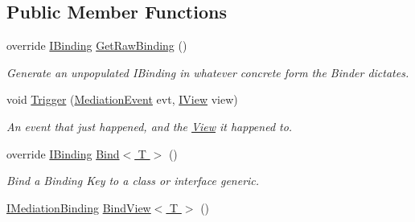 \subsection*{Public Member Functions}
\begin{DoxyCompactItemize}
\item 
\hypertarget{classstrange_1_1extensions_1_1mediation_1_1impl_1_1_mediation_binder_a8979dac1fe07f85a453ecb0b43cd9c48}{override \hyperlink{interfacestrange_1_1framework_1_1api_1_1_i_binding}{I\-Binding} \hyperlink{classstrange_1_1extensions_1_1mediation_1_1impl_1_1_mediation_binder_a8979dac1fe07f85a453ecb0b43cd9c48}{Get\-Raw\-Binding} ()}\label{classstrange_1_1extensions_1_1mediation_1_1impl_1_1_mediation_binder_a8979dac1fe07f85a453ecb0b43cd9c48}

\begin{DoxyCompactList}\small\item\em Generate an unpopulated I\-Binding in whatever concrete form the Binder dictates. \end{DoxyCompactList}\item 
void \hyperlink{classstrange_1_1extensions_1_1mediation_1_1impl_1_1_mediation_binder_a239e22ae10b9abac39d32533771457f8}{Trigger} (\hyperlink{namespacestrange_1_1extensions_1_1mediation_1_1api_ae5a81bb1edf9fca1d2aca9f4fada72a8}{Mediation\-Event} evt, \hyperlink{interfacestrange_1_1extensions_1_1mediation_1_1api_1_1_i_view}{I\-View} view)
\begin{DoxyCompactList}\small\item\em An event that just happened, and the \hyperlink{classstrange_1_1extensions_1_1mediation_1_1impl_1_1_view}{View} it happened to. \end{DoxyCompactList}\item 
\hypertarget{classstrange_1_1extensions_1_1mediation_1_1impl_1_1_mediation_binder_a09f66b1d01dca93a0bad43c83d6c03cb}{override \hyperlink{interfacestrange_1_1framework_1_1api_1_1_i_binding}{I\-Binding} \hyperlink{classstrange_1_1extensions_1_1mediation_1_1impl_1_1_mediation_binder_a09f66b1d01dca93a0bad43c83d6c03cb}{Bind$<$ T $>$} ()}\label{classstrange_1_1extensions_1_1mediation_1_1impl_1_1_mediation_binder_a09f66b1d01dca93a0bad43c83d6c03cb}

\begin{DoxyCompactList}\small\item\em Bind a Binding Key to a class or interface generic. \end{DoxyCompactList}\item 
\hypertarget{classstrange_1_1extensions_1_1mediation_1_1impl_1_1_mediation_binder_a26bae55d8922197b67c7cbbcc908c751}{\hyperlink{interfacestrange_1_1extensions_1_1mediation_1_1api_1_1_i_mediation_binding}{I\-Mediation\-Binding} \hyperlink{classstrange_1_1extensions_1_1mediation_1_1impl_1_1_mediation_binder_a26bae55d8922197b67c7cbbcc908c751}{Bind\-View$<$ T $>$} ()}\label{classstrange_1_1extensions_1_1mediation_1_1impl_1_1_mediation_binder_a26bae55d8922197b67c7cbbcc908c751}


\end{DoxyCompactItemize}
